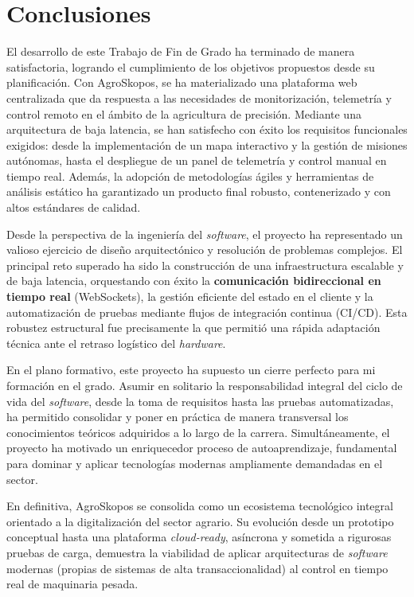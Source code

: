 
\section{Conclusiones}

El desarrollo de este Trabajo de Fin de Grado ha terminado de manera satisfactoria, logrando el cumplimiento de los objetivos propuestos desde su planificación. Con AgroSkopos, se ha materializado una plataforma web centralizada que da respuesta a las necesidades de monitorización, telemetría y control remoto en el ámbito de la agricultura de precisión. Mediante una arquitectura de baja latencia, se han satisfecho con éxito los requisitos funcionales exigidos: desde la implementación de un mapa interactivo y la gestión de misiones autónomas, hasta el despliegue de un panel de telemetría y control manual en tiempo real. Además, la adopción de metodologías ágiles y herramientas de análisis estático ha garantizado un producto final robusto, contenerizado y con altos estándares de calidad.

Desde la perspectiva de la ingeniería del \textit{software}, el proyecto ha representado un valioso ejercicio de diseño arquitectónico y resolución de problemas complejos. El principal reto superado ha sido la construcción de una infraestructura escalable y de baja latencia, orquestando con éxito la \textbf{comunicación bidireccional en tiempo real} (WebSockets), la gestión eficiente del estado en el cliente y la automatización de pruebas mediante flujos de integración continua (CI/CD). Esta robustez estructural fue precisamente la que permitió una rápida adaptación técnica ante el retraso logístico del \textit{hardware}.

En el plano formativo, este proyecto ha supuesto un cierre perfecto para mi formación en el grado. Asumir en solitario la responsabilidad integral del ciclo de vida del \textit{software}, desde la toma de requisitos hasta las pruebas automatizadas, ha permitido consolidar y poner en práctica de manera transversal los conocimientos teóricos adquiridos a lo largo de la carrera. Simultáneamente, el proyecto ha motivado un enriquecedor proceso de autoaprendizaje, fundamental para dominar y aplicar tecnologías modernas ampliamente demandadas en el sector.

En definitiva, AgroSkopos se consolida como un ecosistema tecnológico integral orientado a la digitalización del sector agrario. Su evolución desde un prototipo conceptual hasta una plataforma \textit{cloud-ready}, asíncrona y sometida a rigurosas pruebas de carga, demuestra la viabilidad de aplicar arquitecturas de \textit{software} modernas (propias de sistemas de alta transaccionalidad) al control en tiempo real de maquinaria pesada.

